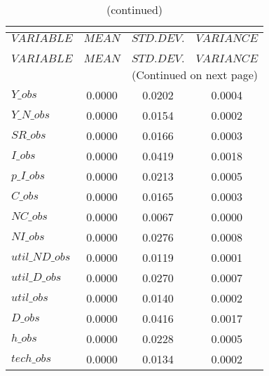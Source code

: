  
\begin{center}
\begin{longtable}{lccc} 
\caption{THEORETICAL MOMENTS}\\
 \label{Table:th_moments}\\
\toprule 
$VARIABLE       $	 & 	 $         MEAN$	 & 	 $    STD. DEV.$	 & 	 $     VARIANCE$\\
\midrule \endfirsthead 
\caption{(continued)}\\
 \toprule \\ 
$VARIABLE       $	 & 	 $         MEAN$	 & 	 $    STD. DEV.$	 & 	 $     VARIANCE$\\
\midrule \endhead 
\midrule \multicolumn{4}{r}{(Continued on next page)} \\ \bottomrule \endfoot 
\bottomrule \endlastfoot 
$Y\_obs         $	 & 	       0.0000	 & 	       0.0202	 & 	       0.0004 \\ 
$Y\_N\_obs      $	 & 	       0.0000	 & 	       0.0154	 & 	       0.0002 \\ 
$SR\_obs        $	 & 	       0.0000	 & 	       0.0166	 & 	       0.0003 \\ 
$I\_obs         $	 & 	       0.0000	 & 	       0.0419	 & 	       0.0018 \\ 
$p\_I\_obs      $	 & 	       0.0000	 & 	       0.0213	 & 	       0.0005 \\ 
$C\_obs         $	 & 	       0.0000	 & 	       0.0165	 & 	       0.0003 \\ 
$NC\_obs        $	 & 	       0.0000	 & 	       0.0067	 & 	       0.0000 \\ 
$NI\_obs        $	 & 	       0.0000	 & 	       0.0276	 & 	       0.0008 \\ 
$util\_ND\_obs  $	 & 	       0.0000	 & 	       0.0119	 & 	       0.0001 \\ 
$util\_D\_obs   $	 & 	       0.0000	 & 	       0.0270	 & 	       0.0007 \\ 
$util\_obs      $	 & 	       0.0000	 & 	       0.0140	 & 	       0.0002 \\ 
$D\_obs         $	 & 	       0.0000	 & 	       0.0416	 & 	       0.0017 \\ 
$h\_obs         $	 & 	       0.0000	 & 	       0.0228	 & 	       0.0005 \\ 
$tech\_obs      $	 & 	       0.0000	 & 	       0.0134	 & 	       0.0002 \\ 
\end{longtable}
 \end{center}
